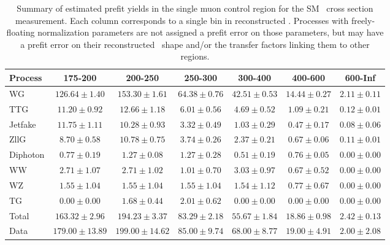 \begin{table}[htbp]
  \begin{center}
    \caption{Summary of estimated prefit yields in the single muon control region for the SM \zinvg\ cross section measurement.
    Each column corresponds to a single bin in reconstructed \ETgamma. Processes with freely-floating normalization parameters
    are not assigned a prefit error on those parameters, but may have a prefit error on their reconstructed \ETgamma\ shape
    and/or the transfer factors linking them to other regions.}
    \label{tab:BkgSummaryMonomu_prefit}
    \begin{tabular}{|l|c|c|c|c|c|c|}
      \hline
      Process & 175-200 & 200-250 & 250-300 & 300-400 & 400-600 & 600-Inf \\
      \hline
      WG & $126.64{\pm}1.40$ & $153.30{\pm}1.61$ & $64.38{\pm}0.76$ & $42.51{\pm}0.53$ & $14.44{\pm}0.27$ & $2.11{\pm}0.11$ \\
      TTG & $11.20{\pm}0.92$ & $12.66{\pm}1.18$ & $6.01{\pm}0.56$ & $4.69{\pm}0.52$ & $1.09{\pm}0.21$ & $0.12{\pm}0.01$ \\
      Jetfake & $11.75{\pm}1.11$ & $10.28{\pm}0.93$ & $3.32{\pm}0.49$ & $1.03{\pm}0.29$ & $0.47{\pm}0.17$ & $0.08{\pm}0.06$ \\
      ZllG & $8.70{\pm}0.58$ & $10.78{\pm}0.75$ & $3.74{\pm}0.26$ & $2.37{\pm}0.21$ & $0.67{\pm}0.06$ & $0.11{\pm}0.01$ \\
      Diphoton & $0.77{\pm}0.19$ & $1.27{\pm}0.08$ & $1.27{\pm}0.28$ & $0.51{\pm}0.19$ & $0.76{\pm}0.05$ & $0.00{\pm}0.00$ \\
      WW & $2.71{\pm}1.07$ & $2.71{\pm}1.02$ & $1.01{\pm}0.70$ & $3.03{\pm}0.97$ & $0.67{\pm}0.52$ & $0.00{\pm}0.00$ \\
      WZ & $1.55{\pm}1.04$ & $1.55{\pm}1.04$ & $1.55{\pm}1.04$ & $1.54{\pm}1.12$ & $0.77{\pm}0.67$ & $0.00{\pm}0.00$ \\
      TG & $0.00{\pm}0.00$ & $1.68{\pm}0.44$ & $2.01{\pm}0.62$ & $0.00{\pm}0.00$ & $0.00{\pm}0.00$ & $0.00{\pm}0.00$ \\
      \hline
      Total & $163.32{\pm}2.96$ & $194.23{\pm}3.37$ & $83.29{\pm}2.18$ & $55.67{\pm}1.84$ & $18.86{\pm}0.98$ & $2.42{\pm}0.13$ \\
      \hline
      Data & $179.00{\pm}13.89$ & $199.00{\pm}14.62$ & $85.00{\pm}9.74$ & $68.00{\pm}8.77$ & $19.00{\pm}4.91$ & $2.00{\pm}2.08$ \\
      \hline
    \end{tabular}
  \end{center}
\end{table}


